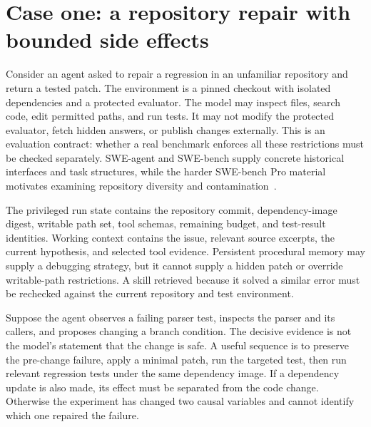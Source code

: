 \section{Case one: a repository repair with bounded side effects}\label{sec:C33:02}
Consider an agent asked to repair a regression in an unfamiliar repository and return a tested patch. The environment is a pinned checkout with isolated dependencies and a protected evaluator. The model may inspect files, search code, edit permitted paths, and run tests. It may not modify the protected evaluator, fetch hidden answers, or publish changes externally. This is an evaluation contract: whether a real benchmark enforces all these restrictions must be checked separately. SWE-agent and SWE-bench supply concrete historical interfaces and task structures, while the harder SWE-bench Pro material motivates examining repository diversity and contamination~\cite{yang2024sweagent,jimenez2023swebench,corpus250916941}.

The privileged run state contains the repository commit, dependency-image digest, writable path set, tool schemas, remaining budget, and test-result identities. Working context contains the issue, relevant source excerpts, the current hypothesis, and selected tool evidence. Persistent procedural memory may supply a debugging strategy, but it cannot supply a hidden patch or override writable-path restrictions. A skill retrieved because it solved a similar error must be rechecked against the current repository and test environment.

Suppose the agent observes a failing parser test, inspects the parser and its callers, and proposes changing a branch condition. The decisive evidence is not the model's statement that the change is safe. A useful sequence is to preserve the pre-change failure, apply a minimal patch, run the targeted test, then run relevant regression tests under the same dependency image. If a dependency update is also made, its effect must be separated from the code change. Otherwise the experiment has changed two causal variables and cannot identify which one repaired the failure.

